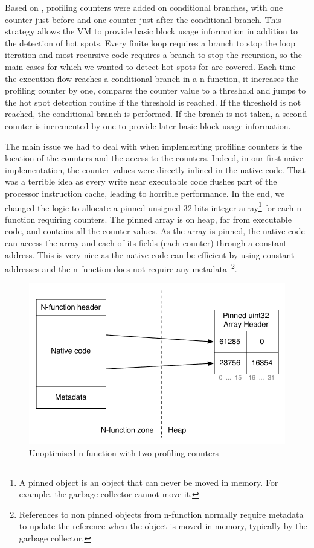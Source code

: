 \documentclass[a4paper,12pt,twoside]{../includes/ThesisStyle}
\begin{document}
Based on \cite{Arn02}, profiling counters were added on conditional branches, with one counter just before and one counter just after the conditional branch. This strategy allows the VM to provide basic block usage information in addition to the detection of hot spots. Every finite loop requires a branch to stop the loop iteration and most recursive code requires a branch to stop the recursion, so the main cases for which we wanted to detect hot spots for are covered. Each time the execution flow reaches a conditional branch in a n-function, it increases the profiling counter by one, compares the counter value to a threshold and jumps to the hot spot detection routine if the threshold is reached. If the threshold is not reached, the conditional branch is performed. If the branch is not taken, a second counter is incremented by one to provide later basic block usage information.

The main issue we had to deal with when implementing profiling counters is the location of the counters and the access to the counters. Indeed, in our first naive implementation, the counter values were directly inlined in the native code. That was a terrible idea as every write near executable code flushes part of the processor instruction cache, leading to horrible performance. In the end, we changed the logic to allocate a pinned unsigned 32-bits integer array\footnote{A pinned object is an object that can never be moved in memory. For example, the garbage collector cannot move it.} for each n-function requiring counters. The pinned array is on heap, far from executable code, and contains all the counter values. As the array is pinned, the native code can access the array and each of its fields (each counter) through a constant address. This is very nice as the native code can be efficient by using constant addresses and the n-function does not require any metadata~\footnote{References to non pinned objects from n-function normally require metadata to update the reference when the object is moved in memory, typically by the garbage collector.}.

\begin{figure}[h!]
    \begin{center}
        \includegraphics[width=0.8\linewidth]{ProfilingCounters}
        \caption{Unoptimised n-function with two profiling counters}
        \label{fig:ProfilingCounters}
    \end{center}
\end{figure}
\end{document}
